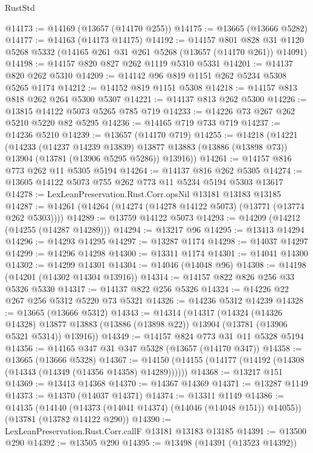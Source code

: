 \begin{lexlean}{RustStd}
\begin{coremodule}
@14173 := @14169 (@13657 (@14170 @255))
@14175 := @13665 (@13666 @5282)
@14177 := @14163 (@14173 @14175)
@14192 := @14157
    @801
    @828
    @31
    @1120
    @5268
    @5332
    (@14165 @261 @31 @261 @5268 (@13657 (@14170 @261)) @14091)
@14198 := @14157 @820 @827 @262 @1119 @5310 @5331
@14201 := @14137 @820 @262 @5310
@14209 := @14142 @96 @819 @1151 @262 @5234 @5308 @5265 @1174
@14212 := @14152 @819 @1151 @5308
@14218 := @14157 @813 @818 @262 @264 @5300 @5307
@14221 := @14137 @813 @262 @5300
@14226 := @13815 @14122 @5073 @5265 @785 @719
@14233 := @14226 @73 @267 @262 @5210 @5220 @82 @5295
@14236 := @14165 @719 @733 @719
@14237 := @14236 @5210
@14239 := @13657 (@14170 @719)
@14255 := @14218
    (@14221
      (@14233
        (@14237 @14239 @13839)
        @13877
        @13883
        (@13886 (@13898 @73))
        @13904
        (@13781 (@13906 @5295 @5286))
        @13916))
@14261 := @14157 @816 @773 @262 @11 @5305 @5194
@14264 := @14137 @816 @262 @5305
@14274 := @13605 @14122 @5073 @755 @262 @773 @11 @5234 @5194 @5303 @13617
@14278 := LexLeanPreservation.Rust.Corr.opsNil @13181 @13183 @13185
@14287 := @14261 (@14264 (@14274 (@14278 @14122 @5073) (@13771 (@13774 @262 @5303))))
@14289 := @13759 @14122 @5073
@14293 := @14209 (@14212 (@14255 (@14287 @14289)))
@14294 := @13217 @96
@14295 := @13413 @14294
@14296 := @14293 @14295
@14297 := @13287 @1174
@14298 := @14037 @14297
@14299 := @14296 @14298
@14300 := @13311 @1174
@14301 := @14041 @14300
@14302 := @14299 @14301
@14304 := @14046 (@14048 @96)
@14308 := @14198 (@14201 (@14302 @14304 @13916))
@14314 := @14157 @822 @826 @256 @33 @5326 @5330
@14317 := @14137 @822 @256 @5326
@14324 := @14226 @22 @267 @256 @5312 @5220 @73 @5321
@14326 := @14236 @5312 @14239
@14328 := @13665 (@13666 @5312)
@14343 := @14314
    (@14317
      (@14324
        (@14326 @14328)
        @13877
        @13883
        (@13886 (@13898 @22))
        @13904
        (@13781 (@13906 @5321 @5314))
        @13916))
@14349 := @14157 @824 @773 @31 @11 @5328 @5194
@14356 := @14165 @347 @31 @347 @5328 (@13657 (@14170 @347))
@14358 := @13665 (@13666 @5328)
@14367 := @14150 (@14155 (@14177 (@14192 (@14308 (@14343 (@14349 (@14356 @14358) @14289))))))
@14368 := @13217 @151
@14369 := @13413 @14368
@14370 := @14367 @14369
@14371 := @13287 @1149
@14373 := @14370 (@14037 @14371)
@14374 := @13311 @1149
@14386 := @14135
    (@14140 (@14373 (@14041 @14374) (@14046 (@14048 @151)) @14055))
    (@13781 (@13782 @14122 @290))
@14390 := LexLeanPreservation.Rust.Corr.callF @13181 @13183 @13185
@14391 := @13500 @290
@14392 := @13505 @290
@14395 := @13498 (@14391 (@13523 @14392))

\end{coremodule}
\end{lexlean}
